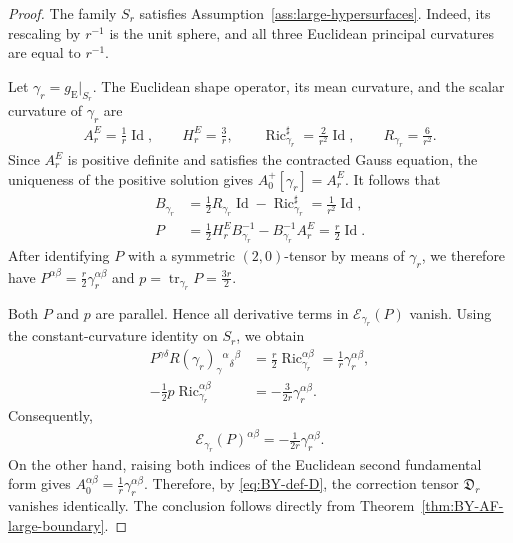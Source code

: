 \documentclass[10pt,a4paper]{amsart}
\newcommand{\gE}{g_{\mathrm{E}}}
\newcommand{\tr}{\operatorname{tr}}
\newcommand{\Ric}{\operatorname{Ric}}
\newcommand{\Id}{\operatorname{Id}}
\begin{document}
	\begin{proof}
		The family ${S_r}$ satisfies
		Assumption~\ref{ass:large-hypersurfaces}. Indeed, its rescaling by
		$r^{-1}$ is the unit sphere, and all three Euclidean principal
		curvatures are equal to $r^{-1}$.
		
		Let $\gamma_r=\gE|_{S_r}$. The Euclidean shape operator, its mean
		curvature, and the scalar curvature of $\gamma_r$ are
		\begin{align*}
			A_r^E
			=
			\frac{1}{r}\Id,
			\qquad
			H_r^E
			=
			\frac{3}{r},
			\qquad
			\Ric_{\gamma_r}^{\sharp}
			=
			\frac{2}{r^2}\Id,
			\qquad
			R_{\gamma_r}
			=
			\frac{6}{r^2}.
		\end{align*}
		Since $A_r^E$ is positive definite and satisfies the contracted
		Gauss equation, the uniqueness of the positive solution gives
		$A_0^+[\gamma_r]=A_r^E$. It follows that
		\begin{align*}
			B_{\gamma_r}
			&=
			\frac12R_{\gamma_r}\Id
			-
			\Ric_{\gamma_r}^{\sharp}
			=
			\frac{1}{r^2}\Id,
			\\
			P
			&=
			\frac12H_r^E B_{\gamma_r}^{-1}
			-
			B_{\gamma_r}^{-1}A_r^E
			=
			\frac r2\Id.
		\end{align*}
		After identifying $P$ with a symmetric $(2,0)$-tensor by means of
		$\gamma_r$, we therefore have
		$P^{\alpha\beta}=\frac r2\gamma_r^{\alpha\beta}$ and
		$p=\tr_{\gamma_r}P=\frac{3r}{2}$.
		
		Both $P$ and $p$ are parallel. Hence all derivative terms in
		$\mathcal E_{\gamma_r}(P)$ vanish. Using the constant-curvature identity on
		$S_r$, we obtain
		\begin{align*}
			P^{\gamma\delta}
			R(\gamma_r)_{\gamma}{}^{\alpha}{}_{\delta}{}^{\beta}
			&=
			\frac r2\Ric_{\gamma_r}^{\alpha\beta}
			=
			\frac1r\gamma_r^{\alpha\beta},
			\\
			-\frac12p\Ric_{\gamma_r}^{\alpha\beta}
			&=
			-\frac{3}{2r}\gamma_r^{\alpha\beta}.
		\end{align*}
		Consequently,
		\begin{align*}
			\mathcal E_{\gamma_r}(P)^{\alpha\beta}
			=
			-\frac{1}{2r}\gamma_r^{\alpha\beta}.
		\end{align*}
		On the other hand, raising both indices of the Euclidean second
		fundamental form gives
		$A_0^{\alpha\beta}=\frac1r\gamma_r^{\alpha\beta}$. Therefore,
		by \eqref{eq:BY-def-D}, the correction tensor $\mathfrak D_r$ vanishes identically. The conclusion follows directly from
		Theorem~\ref{thm:BY-AF-large-boundary}.
	\end{proof}
	
\end{document}
